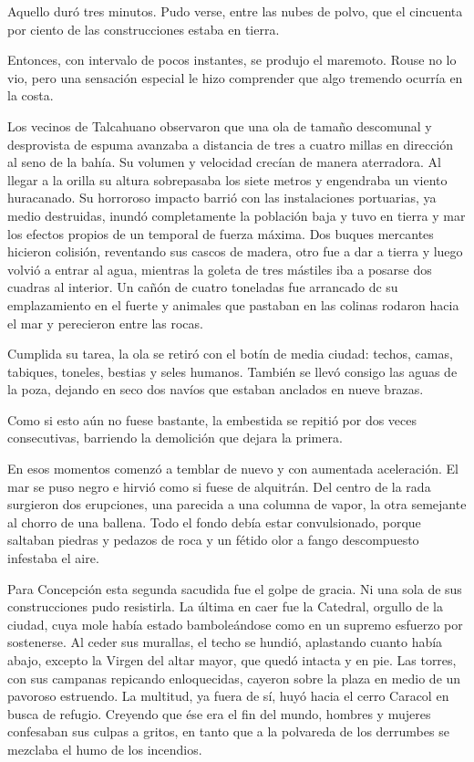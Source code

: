 \documentclass[10pt,twoside,openright]{memoir}
\begin{document}
Aquello duró tres minutos. Pudo verse, entre las nubes de polvo, que el
cincuenta por ciento de las construcciones estaba en tierra.

Entonces, con intervalo de pocos instantes, se produjo el maremoto.
Rouse no lo vio, pero una sensación especial le hizo comprender que algo
tremendo ocurría en la costa.

Los vecinos de Talcahuano observaron que una ola de tamaño descomunal y
desprovista de espuma avanzaba a distancia de tres a cuatro millas en
dirección al seno de la bahía. Su volumen y velocidad crecían de manera
aterradora. Al llegar a la orilla su altura sobrepasaba los siete metros
y engendraba un viento huracanado. Su horroroso impacto barrió con las
instalaciones portuarias, ya medio destruidas, inundó completamente la
población baja y tuvo en tierra y mar los efectos propios de un temporal
de fuerza máxima. Dos buques mercantes hicieron colisión, reventando sus
cascos de madera, otro fue a dar a tierra y luego volvió a entrar al
agua, mientras la goleta de tres mástiles iba a posarse dos cuadras al
interior. Un cañón de cuatro toneladas fue arrancado dc su emplazamiento
en el fuerte y animales que pastaban en las colinas rodaron hacia el mar
y perecieron entre las rocas.

Cumplida su tarea, la ola se retiró con el botín de media ciudad:
techos, camas, tabiques, toneles, bestias y seles humanos. También se
llevó consigo las aguas de la poza, dejando en seco dos navíos que
estaban anclados en nueve brazas.

Como si esto aún no fuese bastante, la embestida se repitió por dos
veces consecutivas, barriendo la demolición que dejara la primera.

En esos momentos comenzó a temblar de nuevo y con aumentada aceleración.
El mar se puso negro e hirvió como si fuese de alquitrán. Del centro de
la rada surgieron dos erupciones, una parecida a una columna de vapor,
la otra semejante al chorro de una ballena. Todo el fondo debía estar
convulsionado, porque saltaban piedras y pedazos de roca y un fétido
olor a fango descompuesto infestaba el aire.

Para Concepción esta segunda sacudida fue el golpe de gracia. Ni una
sola de sus construcciones pudo resistirla. La última en caer fue la
Catedral, orgullo de la ciudad, cuya mole había estado bamboleándose
como en un supremo esfuerzo por sostenerse. Al ceder sus murallas, el
techo se hundió, aplastando cuanto había abajo, excepto la Virgen del
altar mayor, que quedó intacta y en pie. Las torres, con sus campanas
repicando enloquecidas, cayeron sobre la plaza en medio de un pavoroso
estruendo. La multitud, ya fuera de sí, huyó hacia el cerro Caracol en
busca de refugio. Creyendo que ése era el fin del mundo, hombres y
mujeres confesaban sus culpas a gritos, en tanto que a la polvareda de
los derrumbes se mezclaba el humo de los incendios.
\end{document}
